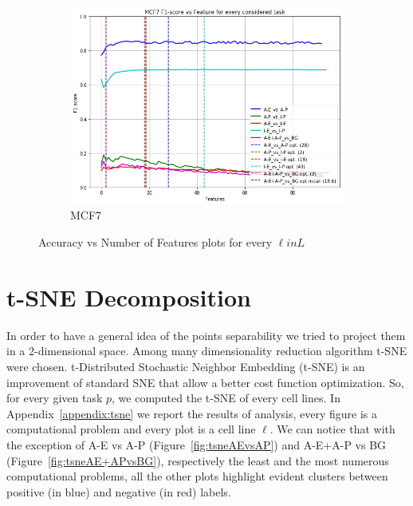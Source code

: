 \begin{figure}[!htb]
    \begin{subfigure}[b]{0.48\textwidth}
        \includegraphics[width=\textwidth]{images/features_plots/MCF7_feature_plot.png}
        \caption{MCF7}
        \label{fig:MCF7_n_feat}
    \end{subfigure}
    \caption{Accuracy vs Number of Features plots for every $\ell in L$}\label{fig:feats_plot}
\end{figure}


\section{t-SNE Decomposition}
In order to have a general idea of the points separability we tried to  project them in a 2-dimensional space. Among many dimensionality reduction algorithm t-SNE were chosen. t-Distributed Stochastic Neighbor Embedding (t-SNE) \cite{vanDerMaaten2008} is an improvement of standard SNE \cite{HintonSNE} that allow a better cost function optimization. So, for every given task $p$, we  computed the t-SNE of every cell lines. 
In Appendix~\ref{appendix:tsne} we report the results of analysis, every figure is a computational problem and every plot is a cell line $\ell$. We can notice that with the exception of A-E vs A-P (Figure~\ref{fig:tsneAEvsAP}) and A-E+A-P vs BG (Figure~\ref{fig:tsneAE+APvsBG}), respectively the least and the most numerous computational problems, all the other plots highlight evident clusters between positive (in blue) and negative (in red) labels. 